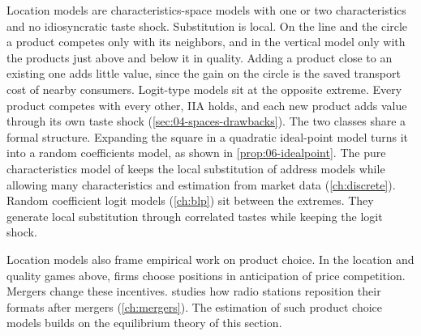 Location models are characteristics-space models with one or two characteristics and no idiosyncratic taste
shock. Substitution is local. On the line and the circle a product competes only with its neighbors, and in the
vertical model only with the products just above and below it in quality. Adding a product close to an existing one
adds little value, since the gain on the circle is the saved transport cost of nearby consumers. Logit-type models
sit at the opposite extreme. Every product competes with every other, IIA holds, and each new product adds value
through its own taste shock (\cref{sec:04-spaces-drawbacks}). The two classes share a formal structure.
Expanding the square in a quadratic ideal-point model turns it into a random coefficients model, as shown in
\cref{prop:06-idealpoint}. The pure characteristics model of \citet{BerryPakes2007} keeps the local substitution of
address models while allowing many characteristics and estimation from market data (\cref{ch:discrete}). Random
coefficient logit models (\cref{ch:blp}) sit between the extremes. They generate local substitution through
correlated tastes while keeping the logit shock.

Location models also frame empirical work on product choice. In the location and quality games above, firms choose
positions in anticipation of price competition. Mergers change these incentives.  studies how
radio stations reposition their formats after mergers (\cref{ch:mergers}). The estimation of such product choice
models builds on the equilibrium theory of this section.
